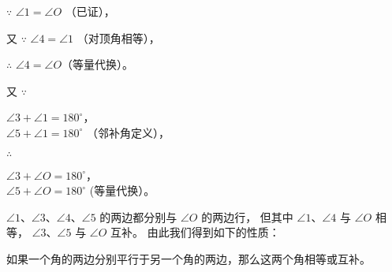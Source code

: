 $\because$ \quad $\angle 1 = \angle O$ （已证），

又 $\because$ \quad $\angle 4 = \angle 1$ （对顶角相等），

$\therefore$ \quad $\angle 4 = \angle O$（等量代换）。

又 $\because$ \quad \begin{zmtblr}[t]{}
    $\angle 3 + \angle 1 = 180^\circ$， \\
    $\angle 5 + \angle 1 = 180^\circ$ （邻补角定义）， \\
\end{zmtblr}

$\therefore$ \quad \begin{zmtblr}[t]{}
    $\angle 3 + \angle O = 180^\circ$， \\
    $\angle 5 + \angle O = 180^\circ$ (等量代换）。
\end{zmtblr}

$\angle 1$、$\angle 3$、$\angle 4$、$\angle 5$ 的两边都分别与 $\angle O$ 的两边行，
但其中 $\angle 1$、$\angle 4$ 与 $\angle O$ 相等， $\angle 3$、$\angle 5$ 与 $\angle O$ 互补。
由此我们得到如下的性质：

\begin{xingzhi}
    如果一个角的两边分别平行于另一个角的两边，那么这两个角相等或互补。
\end{xingzhi}


